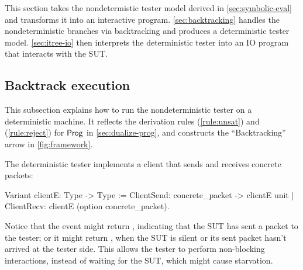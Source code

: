 This section takes the nondetermistic tester model derived in
\autoref{sec:symbolic-eval} and transforms it into an interactive program.
\autoref{sec:backtracking} handles the nondeterministic branches via
backtracking and produces a deterministic tester model.  \autoref{sec:itree-io}
then interprets the deterministic tester into an IO program that interacts with
the SUT.

\subsection{Backtrack execution}
\label{sec:backtracking}
This subsection explains how to run the nondeterministic tester on a
deterministic machine.  It reflects the derivation rules (\ref{rule:unsat}) and
(\ref{rule:reject}) for $\mathsf{Prog}$ in \autoref{sec:dualize-prog}, and constructs
the ``Backtracking'' arrow in \autoref{fig:framework}.

The deterministic tester implements a client that sends and receives concrete
packets:
\begin{coq}
  Variant clientE: Type -> Type :=
    ClientSend: concrete_packet -> clientE unit
  | ClientRecv: clientE (option concrete_packet).
\end{coq}

Notice that the  event might return , indicating
that the SUT has sent a packet  to the tester; or it might
return , when the SUT is silent or its sent packet hasn't arrived at
the tester side.  This allows the tester to perform non-blocking interactions,
instead of waiting for the SUT, which might cause starvation.


